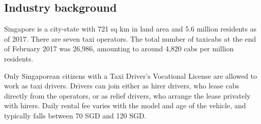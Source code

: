 \documentclass[reviewmode,AEJ]{AEA}
\begin{document}
\subsection{Industry background}
Singapore is a city-state with 721 sq km in land area and 5.6 million residents as of 2017. 
There are seven taxi operators. 
The total number of taxicabs at the end of February 2017 was 26,986, amounting to around 4,820 cabs
per million residents. 

Only Singaporean citizens
with a Taxi Driver's Vocational License are allowed to work as taxi drivers. Drivers can join either 
as hirer drivers, who lease cabs directly from the operators, or as relief drivers, who arrange the 
lease privately with hirers. Daily rental fee varies with the model and age of the vehicle, 
and typically falls between 70 SGD and 120 SGD.
\end{document}
